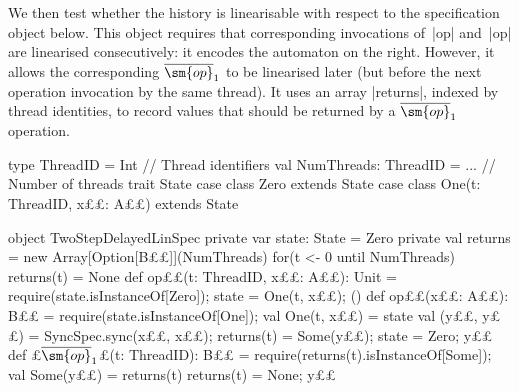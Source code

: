 We then test whether the history is linearisable with respect to the
specification object below.  This object requires that corresponding
invocations of~|op| and~|op| are linearised consecutively: it encodes
the automaton on the right.  However, it allows
the corresponding $\overline{\sm{op}}_1$ to be linearised later (but before
the next operation invocation by the same thread).  It uses an array
|returns|, indexed by thread identities, to record values that should be
returned by a $\overline{\sm{op}}_1$ operation.
%
\begin{trivlist}
\item[]
\begin{minipage}{92mm}
\begin{scala}
type ThreadID = Int               // Thread identifiers
val NumThreads: ThreadID = ... // Number of threads
trait State
case class Zero extends State
case class One(t: ThreadID, x££: A££) extends State
\end{scala}
\end{minipage}
\hfill 
%
\begin{minipage}{37.8mm}
%
\end{minipage}%
\begin{scala}
object TwoStepDelayedLinSpec{
  private var state: State = Zero
  private val returns = new Array[Option[B££]](NumThreads)
  for(t <- 0 until NumThreads) returns(t) = None
  def op££(t: ThreadID, x££: A££): Unit = {
    require(state.isInstanceOf[Zero]); state = One(t, x££); ()
  }
  def op££(x££: A££): B££ = {
    require(state.isInstanceOf[One]); val One(t, x££) = state
    val (y££, y££) = SyncSpec.sync(x££, x££); returns(t) = Some(y££); state = Zero; y££
  }
  def £$\overline{\sm{op}}_1$£(t: ThreadID): B££ = {
    require(returns(t).isInstanceOf[Some]); val Some(y££) = returns(t)
    returns(t) = None; y££
  }
}
\end{scala}
\end{trivlist}

